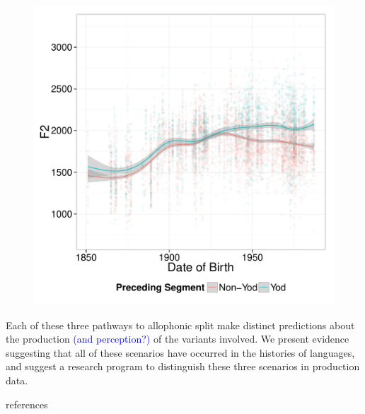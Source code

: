 \documentclass[10pt,letterpaper]{article}
\begin{document}
\begin{figure}
\includegraphics[width=0.4\linewidth]{By_Token_Old_Preceding}
\end{figure}

\floatbarrier

\noindent Each of these three pathways to allophonic split make distinct predictions about the production \textcolor{blue}{(and perception?)} of the variants involved. We present evidence suggesting that all of these scenarios have occurred in the histories of languages, and suggest a research program to distinguish these three scenarios in production data. 


references
\end{document}
